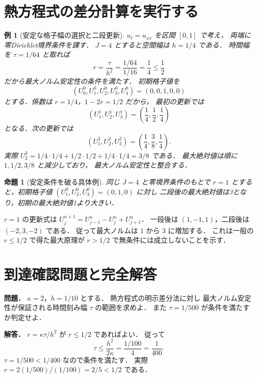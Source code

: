 \documentclass[a5paper,10pt,onecolumn]{jsarticle}
\makeatletter
\theoremstyle{mathnotetheorem}
\newtheorem{proposition}[theorem]{命題}
\newtheorem{example}[theorem]{例}
\renewcommand{\proofname}{証明}
\renewenvironment{proof}[1][\proofname]{%
  \par\pushQED{\qed}\normalfont\topsep4\p@\@plus2\p@\relax
  \trivlist\item[\hskip\labelsep\bfseries #1]\ignorespaces
}{\popQED\endtrivlist\@endpefalse}
\makeatother
\begin{document}
\section{熱方程式の差分計算を実行する}
\begin{example}[安定な格子幅の選択と二段更新]
$u_t=u_{xx}$ を区間 $[0,1]$ で考え，
両端に零Dirichlet境界条件を課す．
$J=4$ とすると空間幅は $h=1/4$ である．
時間幅を $\tau=1/64$ と取れば
\[
 r=\frac{\tau}{h^2}
 =\frac{1/64}{1/16}=\frac14\le\frac12
\]
だから最大ノルム安定性の条件を満たす．
初期格子値を
\[
 (U_0^0,U_1^0,U_2^0,U_3^0,U_4^0)
 =(0,0,1,0,0)
\]
とする．係数は $r=1/4$，$1-2r=1/2$ だから，
最初の更新では
\[
 (U_1^1,U_2^1,U_3^1)
 =\left(\frac14,\frac12,\frac14\right)
\]
となる．次の更新では
\[
 (U_1^2,U_2^2,U_3^2)
 =\left(\frac14,\frac38,\frac14\right).
\]
実際 $U_2^2=1/4\cdot1/4+
1/2\cdot1/2+1/4\cdot1/4=3/8$ である．
最大絶対値は順に $1,1/2,3/8$ と減少しており，
最大ノルム安定性と整合する．
\end{example}
\begin{proposition}[安定条件を破る具体例]\label{prop:fd-unstable}
同じ $J=4$ と零境界条件のもとで
$r=1$ とすると，初期格子値
$(U_1^0,U_2^0,U_3^0)=(0,1,0)$ に対し
二段後の最大絶対値は3となり，初期の最大絶対値1より大きい．
\end{proposition}
\begin{proof}
$r=1$ の更新式は
$U_j^{n+1}=U_{j-1}^n-U_j^n+U_{j+1}^n$．
一段後は $(1,-1,1)$，二段後は
$(-2,3,-2)$ である．
従って最大ノルムは $1$ から $3$ に増加する．
これは一般の $r\le1/2$ で得た最大原理が
$r>1/2$ で無条件には成立しないことを示す．
\end{proof}
\section*{到達確認問題と完全解答}
\noindent\textbf{問題．}
$\kappa=2$，$h=1/10$ とする．
熱方程式の明示差分法に対し
最大ノルム安定性が保証される時間刻み幅
$\tau$ の範囲を求めよ．
また $\tau=1/500$ が条件を満たすか判定せよ．

\medskip\noindent\textbf{解答．}
$r=\kappa\tau/h^2$ が $r\le1/2$ であればよい．
従って
\[
 \tau\le\frac{h^2}{2\kappa}
       =\frac{1/100}{4}=\frac1{400}.
\]
$\tau=1/500<1/400$ なので条件を満たす．
実際 $r=2(1/500)/(1/100)=2/5<1/2$ である．
\end{document}
